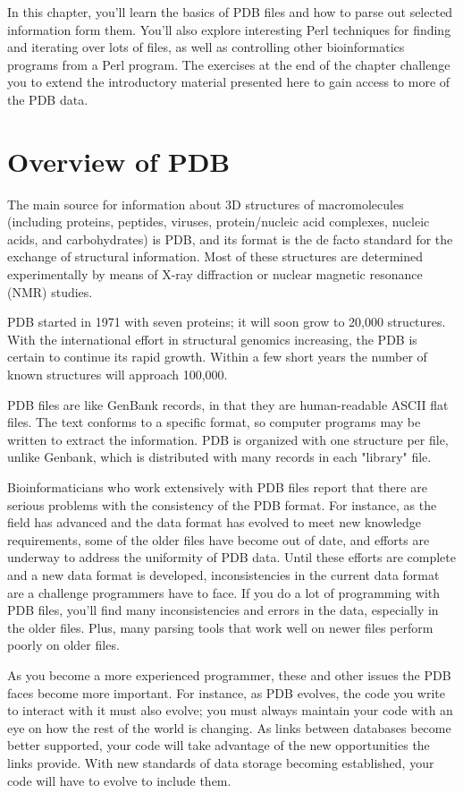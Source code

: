 In this chapter, you'll learn the basics of PDB files and how to parse out selected information form them. You'll also explore interesting Perl techniques for finding and iterating over lots of files, as well as controlling other bioinformatics programs from a Perl program. The exercises at the end of the chapter challenge you to extend the introductory material presented here to gain access to more of the PDB data.

\section{Overview of PDB}
The main source for information about 3D structures of macromolecules (including proteins, peptides, viruses, protein/nucleic acid complexes, nucleic acids, and carbohydrates) is PDB, and its format is the de facto standard for the exchange of structural information. Most of these structures are determined experimentally by means of X-ray diffraction or nuclear magnetic resonance (NMR) studies.

PDB started in 1971 with seven proteins; it will soon grow to 20,000 structures. With the international effort in structural genomics increasing, the PDB is certain to continue its rapid growth. Within a few short years the number of known structures will approach 100,000.  

PDB files are like GenBank records, in that they are human-readable ASCII flat files. The text conforms to a specific format, so computer programs may be written to extract the information. PDB is organized with one structure per file, unlike Genbank, which is distributed with many records in each "library" file.

Bioinformaticians who work extensively with PDB files report that there are serious problems with the consistency of the PDB format. For instance, as the field has advanced and the data format has evolved to meet new knowledge requirements, some of the older files have become out of date, and efforts are underway to address the uniformity of PDB data.  Until these efforts are complete and a new data format is developed, inconsistencies in the current data format are a challenge programmers have to face. If you do a lot of programming with PDB files, you'll find many inconsistencies and errors in the data, especially in the older files. Plus, many parsing tools that work well on newer files perform poorly on older files.

As you become a more experienced programmer, these and other issues the PDB faces become more important. For instance, as PDB evolves, the code you write to interact with it must also evolve; you must always maintain your code with an eye on how the rest of the world is changing. As links between databases become better supported, your code will take advantage of the new opportunities the links provide. With new standards of data storage becoming established, your code will have to evolve to include them.

